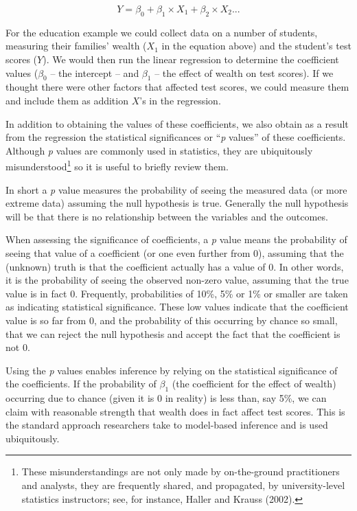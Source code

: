 \documentclass[]{memoir}
\begin{document}
\[ Y = \beta_0 + \beta_1 \times X_1 + \beta_2 \times X_2 ... \]

For the education example we could collect data on a number of students,
measuring their families' wealth ($X_1$ in the equation above) and the
student's test scores ($Y$). We would then run the linear regression to
determine the coefficient values ($\beta_0$ -- the intercept -- and
$\beta_1$ -- the effect of wealth on test scores). If we thought there
were other factors that affected test scores, we could measure them and
include them as addition $X$'s in the regression.

In addition to obtaining the values of these coefficients, we also
obtain as a result from the regression the statistical significances or
``\emph{p} values'' of these coefficients. Although \emph{p} values are
commonly used in statistics, they are ubiquitously
misunderstood\footnote{These misunderstandings are not only made by
  on-the-ground practitioners and analysts, they are frequently shared,
  and propagated, by university-level statistics instructors; see, for
  instance, Haller and Krauss (2002).} so it is useful to briefly review
them.

In short a \emph{p} value measures the probability of seeing the
measured data (or more extreme data) assuming the null hypothesis is
true. Generally the null hypothesis will be that there is no
relationship between the variables and the outcomes.

When assessing the significance of coefficients, a \emph{p} value means
the probability of seeing that value of a coefficient (or one even
further from 0), assuming that the (unknown) truth is that the
coefficient actually has a value of 0. In other words, it is the
probability of seeing the observed non-zero value, assuming that the
true value is in fact 0. Frequently, probabilities of 10\%, 5\% or 1\%
or smaller are taken as indicating statistical significance. These low
values indicate that the coefficient value is so far from 0, and the
probability of this occurring by chance so small, that we can reject the
null hypothesis and accept the fact that the coefficient is not 0.

Using the \emph{p} values enables inference by relying on the
statistical significance of the coefficients. If the probability of
$\beta_1$ (the coefficient for the effect of wealth) occurring due to
chance (given it is 0 in reality) is less than, say 5\%, we can claim
with reasonable strength that wealth does in fact affect test scores.
This is the standard approach researchers take to model-based inference
and is used ubiquitously.
\end{document}

